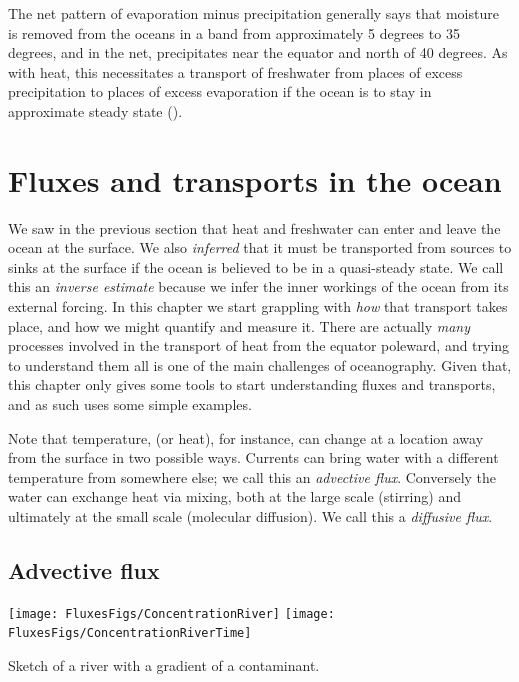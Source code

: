 The net pattern of evaporation minus precipitation generally says that moisture is removed from the oceans in a band from approximately 5 degrees to 35 degrees, and in the net, precipitates near the equator and north of 40 degrees.  As with heat, this necessitates a transport of freshwater from places of excess precipitation to places of excess evaporation if the ocean is to stay in approximate steady state ().   


\section{Fluxes and transports in the ocean}
\label{sec:fluxestransports}

We saw in the previous section that heat and freshwater can enter and leave the ocean at the surface.  We also \emph{inferred} that it must be transported from sources to sinks at the surface if the ocean is believed to be in a quasi-steady state.  We call this an \emph{inverse estimate} because we infer the inner workings of the ocean from its external forcing.  In this chapter we start grappling with \emph{how} that transport takes place, and how we might quantify and measure it.  There are actually \emph{many} processes involved in the transport of heat from the equator poleward, and trying to understand them all is one of  the main challenges of oceanography.  Given that, this chapter only gives some tools to start understanding fluxes and transports, and as such uses some simple examples.  

Note that temperature, (or heat), for instance, can change at a location away from the surface in two possible ways.  Currents can bring water with a different temperature from somewhere else; we call this an \emph{advective flux}.    Conversely the water can exchange heat via mixing, both at the large scale (stirring) and ultimately at the small scale (molecular diffusion).  We call this a \emph{diffusive flux}.  

\subsection{Advective flux} 

\begin{marginfigure}
\begin{center}
\texttt{[image: FluxesFigs/ConcentrationRiver]}
\texttt{[image: FluxesFigs/ConcentrationRiverTime]}
 \caption{Sketch of a river with a gradient of a contaminant.}
  \label{fig:ConcentrationRiver}
\end{center}
\end{marginfigure}


